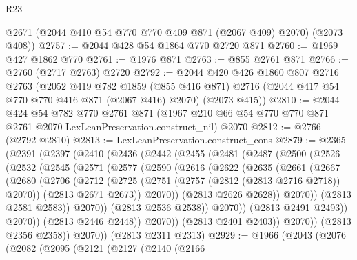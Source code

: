 \begin{lexlean}{R23}
\begin{coremodule}
      @2671
      (@2044 @410 @54 @770 @770 @409 @871 (@2067 @409) @2070)
      (@2073 @408))
@2757 := @2044 @428 @54 @1864 @770 @2720 @871
@2760 := @1969 @427 @1862 @770
@2761 := @1976 @871
@2763 := @855 @2761 @871
@2766 := @2760 (@2717 @2763) @2720
@2792 := @2044
    @420
    @426
    @1860
    @807
    @2716
    @2763
    (@2052
      @419
      @782
      @1859
      (@855 @416 @871)
      @2716
      (@2044 @417 @54 @770 @770 @416 @871 (@2067 @416) @2070)
      (@2073 @415))
@2810 := @2044
    @424
    @54
    @782
    @770
    @2761
    @871
    (@1967 @210 @66 @54 @770 @770 @871 @2761 @2070 LexLeanPreservation.construct_nil)
    @2070
@2812 := @2766 (@2792 @2810)
@2813 := LexLeanPreservation.construct_cons
@2879 := @2365
    (@2391
      (@2397
        (@2410
          (@2436
            (@2442
              (@2455
                (@2481
                  (@2487
                    (@2500
                      (@2526
                        (@2532
                          (@2545
                            (@2571
                              (@2577
                                (@2590
                                  (@2616
                                    (@2622
                                      (@2635
                                        (@2661
                                          (@2667
                                            (@2680
                                              (@2706
                                                (@2712
                                                  (@2725
                                                    (@2751
                                                      (@2757 (@2812 (@2813 @2716 @2718)) @2070))
                                                    (@2813 @2671 @2673))
                                                  @2070))
                                              (@2813 @2626 @2628))
                                            @2070))
                                        (@2813 @2581 @2583))
                                      @2070))
                                  (@2813 @2536 @2538))
                                @2070))
                            (@2813 @2491 @2493))
                          @2070))
                      (@2813 @2446 @2448))
                    @2070))
                (@2813 @2401 @2403))
              @2070))
          (@2813 @2356 @2358))
        @2070))
    (@2813 @2311 @2313)
@2929 := @1966
    (@2043
      (@2076
        (@2082
          (@2095
            (@2121
              (@2127
                (@2140
                  (@2166

\end{coremodule}
\end{lexlean}
